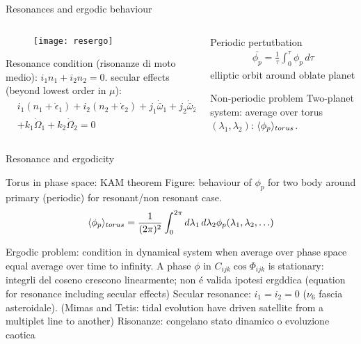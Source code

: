 \begin{frame}{Resonances and ergodic behaviour}
\begin{columns}[T]
\begin{column}{0.45\textwidth}
\begin{figure}[!t]
\texttt{[image: resergo]}
\end{figure}
Resonance condition (risonanze di moto medio): $i_1n_1+i_2n_2=0$.
secular effects (beyond lowest order in $\mu$):
\begin{align*}
&i_1(n_1+\dot{\epsilon}_1)+i_2(n_2+\dot{\epsilon}_2)+j_1\dot{\bar{\omega}}_1+j_2\dot{\bar{\omega}}_2\\
&+k_1\dot{\Omega}_1+k_2\dot{\Omega}_2=0
\end{align*}
\end{column}
\begin{column}{0.55\textwidth}
\begin{block}{Periodic pertutbation}
\begin{align*}
\bar{\phi_p}=\frac{1}{\tau}\int_0^{\tau}\phi_p\,d\tau
\end{align*}
elliptic orbit around oblate planet
\end{block}
\begin{block}{Non-periodic problem}
Two-planet system: average over torus $(\lambda_1,\lambda_2)$: $\langle \phi_p \rangle_{torus}$.
\end{block}
\end{column}
\end{columns}
\end{frame}

\begin{wordonframe}{Resonance and ergodicity}
\begin{block}{Torus in phase space: KAM theorem}
Figure: behaviour of $\phi_p$ for two body around primary (periodic) for resonant/non resonant case.
\begin{align*}
\langle \phi_p \rangle_{torus}=\frac{1}{(2\pi)^2}\int_0^{2\pi}d\lambda_1\,d\lambda_2\phi_p(\lambda_1,\lambda_2,\ldots)
\end{align*}
\end{block}
Ergodic problem: condition in dynamical system when average over phase space equal average over time to infinity.
A phase $\phi$ in $ C_{ijk}\cos{\Phi_{ijk}}$ is stationary: integrli del coseno crescono linearmente; non \'e valida ipotesi ergddica (equation for resonance including secular effects)
Secular resonance: $i_1=i_2=0$ ($\nu_6$ fascia asteroidale).
(Mimas and Tetis: tidal evolution have driven satellite from a multiplet line to another)
Risonanze: congelano stato dinamico o evoluzione caotica
\end{wordonframe}

